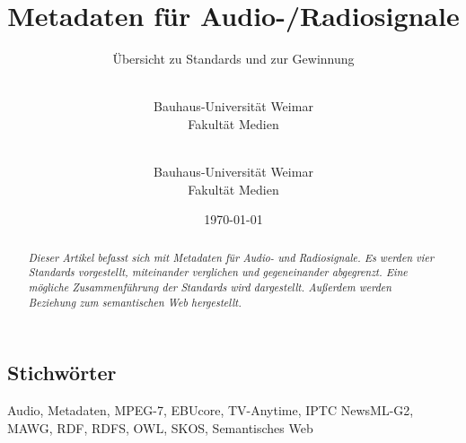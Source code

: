 

\title{Metadaten für Audio-/Radiosignale}
\subtitle{Übersicht zu Standards und zur Gewinnung}
\date{\today}
\author{
	\\
	Bauhaus-Universität Weimar\\
	Fakultät Medien\\
\and
	\\
	Bauhaus-Universität Weimar\\
	Fakultät Medien\\
}





	\maketitle
	
	\begin{abstract}
		\emph{Dieser Artikel befasst sich mit Metadaten für Audio- und Radiosignale. Es werden vier Standards vorgestellt, miteinander verglichen und gegeneinander abgegrenzt. Eine mögliche Zusammenführung der Standards wird dargestellt. Außerdem werden Beziehung zum semantischen Web hergestellt.}
	\end{abstract}
	
	\subsection{Stichwörter}
	Audio, Metadaten, MPEG-7, EBUcore, TV-Anytime, IPTC NewsML-G2, MAWG, RDF, RDFS, OWL, SKOS, Semantisches Web
	
